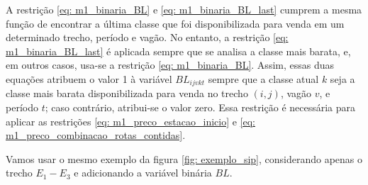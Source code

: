 A restrição \ref{eq: m1_binaria_BL} e \ref{eq: m1_binaria_BL_last} cumprem a mesma função de encontrar a última classe que foi disponibilizada para venda em um determinado trecho, período e vagão. No entanto, a restrição \ref{eq: m1_binaria_BL_last} é aplicada sempre que se analisa a classe mais barata, e, em outros casos, usa-se a restrição \ref{eq: m1_binaria_BL}. Assim, essas duas equações atribuem o valor 1 à variável $BL_{ijvkt}$ sempre que a classe atual $k$ seja a classe mais barata disponibilizada para venda no trecho $(i,j)$, vagão $v$, e período $t$; caso contrário, atribui-se o valor zero. Essa restrição é necessária para aplicar as restrições \ref{eq: m1_preco_estacao_inicio} e \ref{eq: m1_preco_combinacao_rotas_contidas}.

Vamos usar o mesmo exemplo da figura \ref{fig: exemplo_sip}, considerando apenas o trecho $E_1-E_3$ e adicionando a variável binária $BL$.

